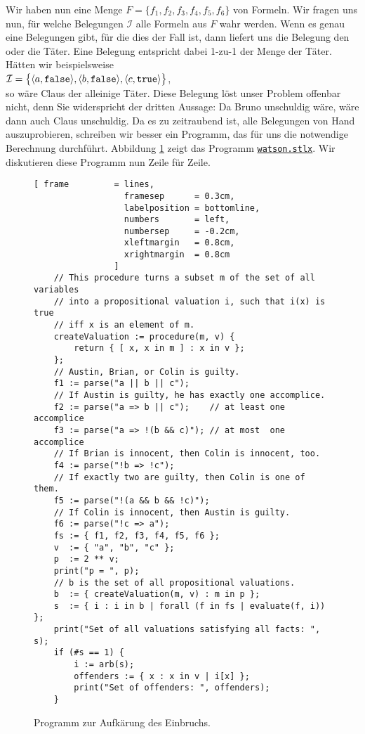 Wir haben nun eine Menge $F = \{ f_1, f_2, f_3, f_4, f_5, f_6 \}$ von Formeln.
Wir fragen uns nun, f\"{u}r welche Belegungen $\mathcal{I}$ alle Formeln aus $F$ wahr werden.
Wenn es genau eine Belegungen gibt, f\"{u}r die dies der Fall ist, dann liefert uns die
Belegung den oder die T\"{a}ter.  Eine Belegung entspricht dabei 1-zu-1 der Menge der T\"{a}ter.
H\"{a}tten wir beispielsweise \\[0.2cm]
\hspace*{1.3cm} 
$\mathcal{I} = \bigl\{ \pair(a,\mathtt{false}), \pair(b,\mathtt{false}), \pair(c,\mathtt{true}) \bigr\}$,
\\[0.2cm]
so w\"{a}re Claus der alleinige T\"{a}ter.  Diese Belegung l\"{o}st unser Problem offenbar
nicht, denn Sie widerspricht der dritten Aussage: Da Bruno unschuldig w\"{a}re, w\"{a}re dann auch
Claus unschuldig.  Da es zu zeitraubend ist, alle Belegungen von Hand auszuprobieren,
schreiben wir besser ein Programm, das f\"{u}r uns die notwendige Berechnung durchf\"{u}hrt.
Abbildung \ref{fig:watson.stlx} zeigt das Programm
\href{https://github.com/karlstroetmann/Logik/blob/master/SetlX/watson.stlx}{\texttt{watson.stlx}}.
Wir diskutieren diese Programm nun Zeile f\"{u}r Zeile.

\begin{figure}[!ht]
  \centering
\begin{Verbatim}[ frame         = lines, 
                  framesep      = 0.3cm, 
                  labelposition = bottomline,
                  numbers       = left,
                  numbersep     = -0.2cm,
                  xleftmargin   = 0.8cm,
                  xrightmargin  = 0.8cm
                ]
    // This procedure turns a subset m of the set of all variables 
    // into a propositional valuation i, such that i(x) is true 
    // iff x is an element of m.
    createValuation := procedure(m, v) {
        return { [ x, x in m ] : x in v };
    };
    // Austin, Brian, or Colin is guilty.
    f1 := parse("a || b || c");
    // If Austin is guilty, he has exactly one accomplice.
    f2 := parse("a => b || c");    // at least one accomplice
    f3 := parse("a => !(b && c)"); // at most  one accomplice
    // If Brian is innocent, then Colin is innocent, too.
    f4 := parse("!b => !c"); 
    // If exactly two are guilty, then Colin is one of them.
    f5 := parse("!(a && b && !c)"); 
    // If Colin is innocent, then Austin is guilty.
    f6 := parse("!c => a");
    fs := { f1, f2, f3, f4, f5, f6 };
    v  := { "a", "b", "c" };
    p  := 2 ** v;
    print("p = ", p);
    // b is the set of all propositional valuations.
    b  := { createValuation(m, v) : m in p };
    s  := { i : i in b | forall (f in fs | evaluate(f, i)) };
    print("Set of all valuations satisfying all facts: ", s);
    if (#s == 1) {
        i := arb(s);
        offenders := { x : x in v | i[x] };
        print("Set of offenders: ", offenders);
    }
\end{Verbatim}
\vspace*{-0.3cm}
  \caption{Programm zur Aufk\"{a}rung des Einbruchs.}
  \label{fig:watson.stlx}
\end{figure}

